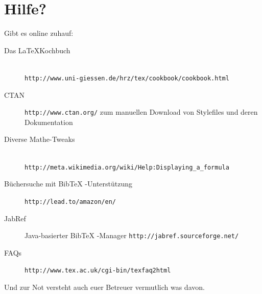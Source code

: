 \section{Hilfe?}

Gibt es online zuhauf:

\begin{description}
  \item[Das \LaTeX Kochbuch]~\\{\tt http://www.uni-giessen.de/hrz/tex/cookbook/cookbook.html}
  \item[CTAN] {\tt http://www.ctan.org/} zum manuellen Download von Stylefiles
      und deren Dokumentation
  \item[Diverse Mathe-Tweaks]~\\ \verb=http://meta.wikimedia.org/wiki/Help:Displaying_a_formula=
  \item[B\"uchersuche mit BibTeX -Unterst\"utzung] {\tt http://lead.to/amazon/en/}
  \item[JabRef] Java-basierter BibTeX -Manager {\tt http://jabref.sourceforge.net/}
  \item[FAQs] {\tt http://www.tex.ac.uk/cgi-bin/texfaq2html}
\end{description}

Und zur Not versteht auch euer Betreuer vermutlich was davon.